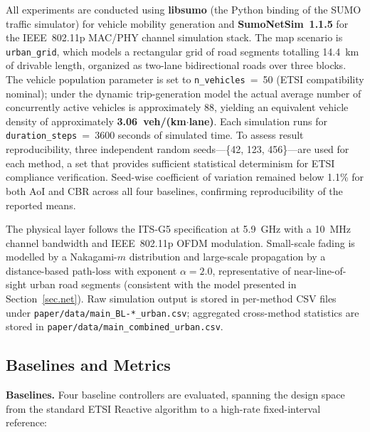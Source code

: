 \documentclass[journal]{IEEEtran}
\begin{document}
All experiments are conducted using \textbf{libsumo} (the Python
binding of the SUMO traffic simulator) for vehicle mobility generation
and \textbf{SumoNetSim~1.1.5} for the IEEE~802.11p MAC/PHY channel
simulation stack.  The map scenario is \texttt{urban\_grid}, which
models a rectangular grid of road segments totalling 14.4~km of
drivable length, organized as two-lane bidirectional roads over three
blocks.  The vehicle population parameter is set to
\texttt{n\_vehicles}~=~50 (ETSI compatibility nominal); under the
dynamic trip-generation model the actual average number of concurrently
active vehicles is approximately 88, yielding an equivalent vehicle
density of approximately \textbf{3.06~veh/(km$\cdot$lane)}.  Each
simulation runs for \texttt{duration\_steps}~=~3600 seconds of
simulated time.  To assess result reproducibility, three independent
random seeds---\{42, 123, 456\}---are used for each method, a set that
provides sufficient statistical determinism for ETSI compliance
verification.  Seed-wise coefficient of variation remained below 1.1\%
for both AoI and CBR across all four baselines, confirming
reproducibility of the reported means.

The physical layer follows the ITS-G5 specification at 5.9~GHz with a
10~MHz channel bandwidth and IEEE~802.11p OFDM modulation.  Small-scale
fading is modelled by a Nakagami-$m$ distribution and large-scale
propagation by a distance-based path-loss with exponent
$\alpha = 2.0$, representative of near-line-of-sight urban road
segments (consistent with the model presented in
Section~\ref{sec.net}).  Raw simulation output is stored in per-method
CSV files under \texttt{paper/data/main\_BL-*\_urban.csv}; aggregated
cross-method statistics are stored in
\texttt{paper/data/main\_combined\_urban.csv}.

\subsection{Baselines and Metrics}
\label{sec.s_setup}

\textbf{Baselines.}
Four baseline controllers are evaluated, spanning the design space
from the standard ETSI Reactive algorithm to a high-rate fixed-interval
reference:
\end{document}
